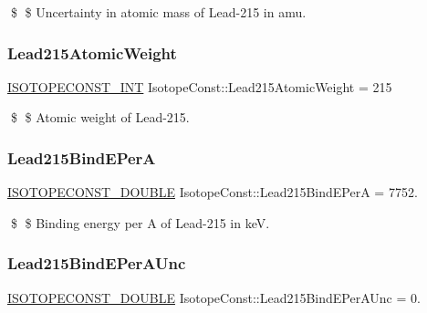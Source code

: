\$ \$ Uncertainty in atomic mass of Lead-\/215 in amu. \mbox{\label{group___isotope_const-_lead-_pb215_gad8367665283b654da3c61ec6441e7f59}} 
\subsubsection{\texorpdfstring{Lead215\+Atomic\+Weight}{Lead215AtomicWeight}}
{\footnotesize\ttfamily \mbox{\hyperlink{group___isotope_const-_macros_ga5f18360b3e99483a35c32d789e62621c}{I\+S\+O\+T\+O\+P\+E\+C\+O\+N\+S\+T\+\_\+\+I\+NT}} Isotope\+Const\+::\+Lead215\+Atomic\+Weight = 215}

\$ \$ Atomic weight of Lead-\/215. \mbox{\label{group___isotope_const-_lead-_pb215_gaad1e8cd53ebcb3dbe0f3a369d02d1bae}} 
\subsubsection{\texorpdfstring{Lead215\+Bind\+E\+PerA}{Lead215BindEPerA}}
{\footnotesize\ttfamily \mbox{\hyperlink{group___isotope_const-_macros_ga8f45a7272ce02c0b4c65c44636ed719a}{I\+S\+O\+T\+O\+P\+E\+C\+O\+N\+S\+T\+\_\+\+D\+O\+U\+B\+LE}} Isotope\+Const\+::\+Lead215\+Bind\+E\+PerA = 7752.}

\$ \$ Binding energy per A of Lead-\/215 in keV. \mbox{\label{group___isotope_const-_lead-_pb215_gad87a3d03741dbe6fdff7a98f54ac50b5}} 
\subsubsection{\texorpdfstring{Lead215\+Bind\+E\+Per\+A\+Unc}{Lead215BindEPerAUnc}}
{\footnotesize\ttfamily \mbox{\hyperlink{group___isotope_const-_macros_ga8f45a7272ce02c0b4c65c44636ed719a}{I\+S\+O\+T\+O\+P\+E\+C\+O\+N\+S\+T\+\_\+\+D\+O\+U\+B\+LE}} Isotope\+Const\+::\+Lead215\+Bind\+E\+Per\+A\+Unc = 0.}


